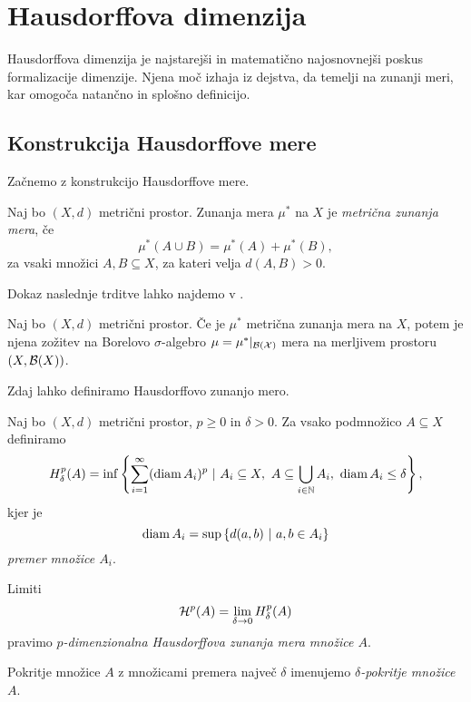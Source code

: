 \section{Hausdorffova dimenzija}
Hausdorffova dimenzija je najstarejši in matematično najosnovnejši poskus formalizacije dimenzije. Njena moč izhaja iz dejstva, da temelji na zunanji meri, kar omogoča natančno in splošno definicijo.

\subsection{Konstrukcija Hausdorffove mere}
Začnemo z konstrukcijo Hausdorffove mere.

\begin{definicija}
    Naj bo \((X, d)\) metrični prostor. Zunanja mera \(\mu^*\) na \(X\) je \emph{metrična zunanja mera}, če 
    \[\mu^*(A \cup B) = \mu^*(A) + \mu^*(B),\]
    za vsaki množici \(A, B \subseteq X\), za kateri velja \(d(A, B) > 0\).
\end{definicija}

Dokaz naslednje trditve lahko najdemo v \cite[stran 349]{f-ra}.
\begin{trditev}
    \label{m-zun-mera}
    Naj bo \((X, d)\) metrični prostor. Če je \(\mu^*\) metrična zunanja mera na \(X\), potem je njena zožitev na Borelovo \(\sigma\)-algebro \(\mu = \mu^*|_{\mathcal{B(X)}}\) mera na merljivem prostoru \((X, \mathcal{B}(X))\).
\end{trditev}

Zdaj lahko definiramo Hausdorffovo zunanjo mero.

\begin{definicija}
    \label{def-haus-mera}
    Naj bo \((X, d)\) metrični prostor, \(p \geq 0\) in \(\delta > 0\). Za vsako podmnožico \(A \subseteq X\) definiramo
    \[
        H^p_\delta(A) = \inf \left\{\sum_{i=1}^{\infty} (\operatorname{diam} A_i)^p \ | \ A_i \subseteq X,\ A \subseteq \bigcup_{i \in \mathbb{N}} A_i,\ \operatorname{diam} A_i \leq \delta\right\},
    \]
    kjer je
    \[
        \operatorname{diam} A_i = \sup \left\{d(a, b) \ | \ a, b \in A_i\right\}
    \]
    \emph{premer množice \(A_i\)}.

    Limiti
    \[
        \mathcal{H}^p(A) = \lim_{\delta \to 0} H_\delta^p(A)
    \]
    pravimo \emph{\(p\)-dimenzionalna Hausdorffova zunanja mera množice \(A\)}.

    Pokritje množice \(A\) z množicami premera največ \(\delta\) imenujemo \emph{\(\delta\)-pokritje množice \(A\)}.
\end{definicija}

